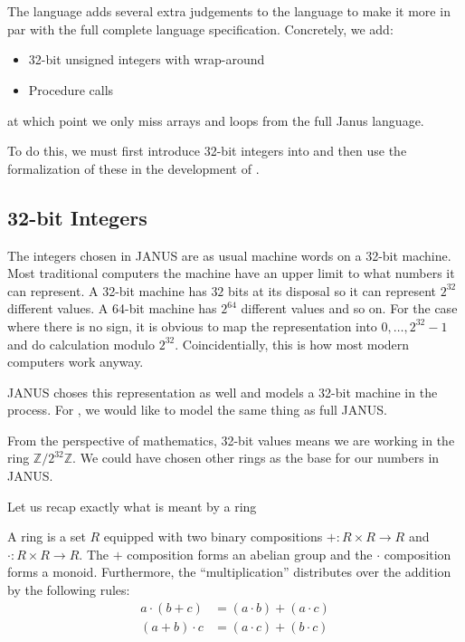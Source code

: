 \chapter{\januso{}}
\label{cha:januso}

The \januso{} language adds several extra judgements to the \janusz{}
language to make it more in par with the full complete language
specification. Concretely, we add:
\begin{itemize}
\item 32-bit unsigned integers with wrap-around
\item Procedure calls
\end{itemize}
at which point we only miss arrays and loops from the full Janus
language.

To do this, we must first introduce 32-bit integers into \coq{} and
then use the formalization of these in the development of \januso{}.

\section{32-bit Integers}
\label{sec:32-bit-integers}

The integers chosen in JANUS are as usual machine words on a 32-bit
machine. Most traditional computers the machine have an upper limit
to what numbers it can represent. A 32-bit machine has $32$ bits at
its disposal so it can represent $2^{32}$ different values. A 64-bit
machine has $2^{64}$ different values and so on. For the case where
there is no sign, it is obvious to map the representation into $0,
\dotsc, 2^{32}-1$ and do calculation modulo $2^{32}$. Coincidentially,
this is how most modern computers work anyway.

JANUS choses this representation as well and models a 32-bit machine
in the process. For \januso{}, we would like to model the same thing
as full JANUS.

From the perspective of mathematics, 32-bit values means we are
working in the ring $\mathbb{Z}/2^{32}\mathbb{Z}$. We could have
chosen other rings as the base for our numbers in JANUS.

Let us recap exactly what is meant by a ring
\begin{defn}
  A ring is a set $R$ equipped with two binary compositions $+\colon R
  \times R \to R$ and $\cdot \colon R \times R \to R$. The $+$
  composition forms an abelian group and the $\cdot$ composition forms
  a monoid. Furthermore, the ``multiplication'' distributes over the
  addition by the following rules:
  \begin{align*}
    a \cdot (b + c) & = (a \cdot b) + (a \cdot c)\\
    (a + b) \cdot c & = (a \cdot c) + (b \cdot c)
  \end{align*}
\end{defn}

